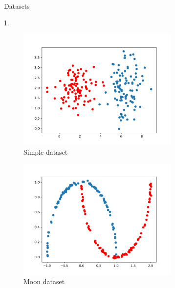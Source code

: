 \documentclass[english]{exercisesheet}
\author{Daniel Strenger, Lorenzo Minneci}
\begin{document}
 \makedocumentheader
  \begin{nexercise}{Datasets}
      \begin{solution} 1.
        \begin{figure}[H]
        \centering
        \includegraphics[width=8cm]{simple.pdf}
        \caption{Simple dataset}
        \end{figure}
        \begin{figure}[H]
        \centering
        \cleardoublepage
        \includegraphics[width=8cm]{moon.pdf}
        \caption{Moon dataset}
        \end{figure}
    \end{solution}
  
 \end{nexercise}
 
\end{document}
